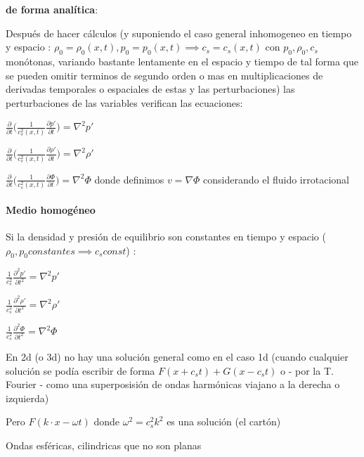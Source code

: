 \documentclass{article}
\begin{document}
\textbf{de forma analítica}:

\begin{description}  



\item Después de hacer cálculos (y suponiendo el caso general inhomogeneo en tiempo y espacio : 
$\rho_0 = \rho_0(x,t),p_0 = p_0(x,t) \implies c_s = c_s(x,t)$ 
con  $p_0, \rho_0, c_s$  monótonas, variando bastante lentamente en el espacio y tiempo de tal forma que se pueden omitir terminos de segundo orden o mas en multiplicaciones de derivadas temporales o espaciales de estas y las perturbaciones) las perturbaciones de las variables verifican las ecuaciones: 

\item $\frac{\partial}{\partial t} \big(\frac{1}{c_s^{2}(x,t)} \frac{\partial p\prime}{\partial t}\big) = \nabla^{2} p\prime    $
\item $\frac{\partial}{\partial t} \big(\frac{1}{c_s^{2}(x,t)} \frac{\partial \rho\prime}{\partial t}\big) = \nabla^{2} \rho\prime    $
\item $\frac{\partial}{\partial t} \big(\frac{1}{c_s^{2}(x,t)} \frac{\partial \Phi}{\partial t}\big) = \nabla^{2} \Phi $ donde definimos  $v = \nabla \Phi$ considerando el fluido irrotacional

\end{description}  

\paragraph{Medio homogéneo}

\begin{description}  
\item Si la densidad y presión de equilibrio son constantes en tiempo y espacio ($\rho_0, p_0 constantes \implies c_s const$) :
\item $\frac{1}{c_s^{2}} \frac{\partial^{2} p\prime}{\partial t^{2}} = \nabla^{2} p\prime    $
\item $\frac{1}{c_s^{2}} \frac{\partial^{2} \rho\prime}{\partial t^{2}} = \nabla^{2} \rho\prime    $
\item $\frac{1}{c_s^{2}} \frac{\partial^{2} \Phi}{\partial t^{2}} = \nabla^{2} \Phi    $
\item En 2d (o 3d) no hay una solución general como en el caso 1d (cuando cualquier solución se podía escribir de  forma $F(x+c_s t) + G(x-c_s t)$ o - por la T. Fourier - como una superposisión de ondas harmónicas viajano a la derecha o izquierda)
\item Pero $F(k \cdot x - \omega t)$ donde $\omega ^2 = c_s^2 k^2$ es una solución (el cartón) 
\item Ondas esféricas, cilindricas que no son planas 

\end{description}  
\end{document}
